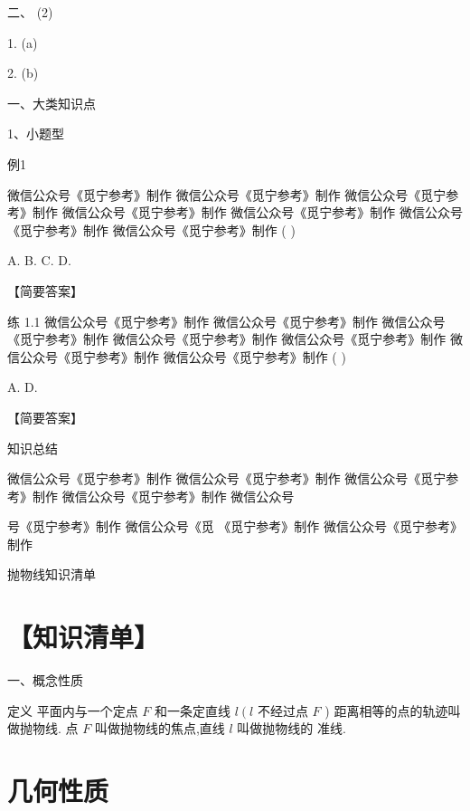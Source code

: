 \documentclass[10pt]{article}
\begin{document}
二、 (2)

1. (a)

2. (b)

一、大类知识点

1、小题型

例1           

微信公众号《觅宁参考》制作 微信公众号《觅宁参考》制作 微信公众号《觅宁参考》制作 微信公众号《觅宁参考》制作 微信公众号《觅宁参考》制作 微信公众号 《觅宁参考》制作 微信公众号《觅宁参考》制作 ( )

A. B. C. D.

【简要答案】

练 1.1 微信公众号《觅宁参考》制作 微信公众号《觅宁参考》制作 微信公众号《觅宁参考》制作 微信公众号《觅宁参考》制作 微信公众号《觅宁参考》制作 微信公众号《觅宁参考》制作 微信公众号《觅宁参考》制作 ( )

A. D.

【简要答案】

知识总结

微信公众号《觅宁参考》制作 微信公众号《觅宁参考》制作 微信公众号《觅宁参考》制作 微信公众号《觅宁参考》制作 微信公众号

号《觅宁参考》制作 微信公众号《觅 《觅宁参考》制作 微信公众号《觅宁参考》制作

抛物线知识清单

\section*{【知识清单】}

一、概念性质

定义 平面内与一个定点 \(F\) 和一条定直线 \(l\left( l\right.\) 不经过点 \(F\) ) 距离相等的点的轨迹叫做抛物线. 点 \(F\) 叫做抛物线的焦点,直线 \(l\) 叫做抛物线的 准线.

\section*{几何性质}
\end{document}

